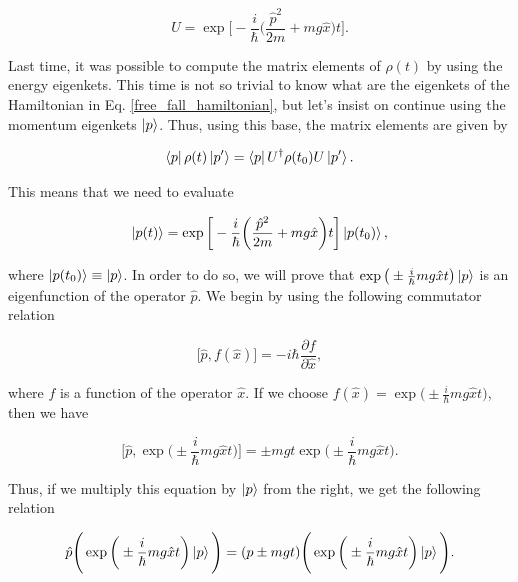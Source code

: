 \documentclass{article}
\begin{document}
\begin{equation}
    U = \exp \bigg[-\frac{i}{\hbar} \bigg( \frac{\hat{p}^{2}}{2m} + mg\hat{x} \bigg) t \bigg].
\end{equation}

Last time, it was possible to compute the matrix elements of $\rho (t)$ by using the energy eigenkets. This time is not so trivial to know what are the eigenkets of the Hamiltonian in Eq. \ref{free_fall_hamiltonian}, but let's insist on continue using the momentum eigenkets $\ket{p}$. Thus, using this base, the matrix elements are given by

\begin{equation}
    \bra{p} \rho (t) \ket{p'} = \bra{p} U^{\dagger} \rho (t_{0}) U \ket{p'}.
\end{equation}

This means that we need to evaluate

\begin{equation}
    \ket{p(t)} = \exp \bigg[-\frac{i}{\hbar} \bigg( \frac{\hat{p}^{2}}{2m} + mg\hat{x} \bigg) t \bigg] \ket{p(t_{0})}, 
\end{equation}

where $\ket{p(t_{0})} \equiv \ket{p}$. In order to do so, we will prove that $\exp \big(\pm \frac{i}{\hbar} mg \hat{x} t \big) \ket{p}$ is an eigenfunction of the operator $\hat{p}$. We begin by using the following commutator relation

\begin{equation}
    \big[ \hat{p}, f(\hat{x}) \big] = -i \hbar \frac{\partial f}{\partial \hat{x}},
\end{equation}

where $f$ is a function of the operator $\hat{x}$. If we choose $f(\hat{x})= \exp \big(\pm \frac{i}{\hbar} mg \hat{x} t \big) $, then we have

\begin{equation}
    \bigg[ \hat{p}, \exp \bigg(\pm \frac{i}{\hbar} mg \hat{x} t \bigg) \bigg] = \pm mgt \exp \bigg(\pm \frac{i}{\hbar} mg \hat{x} t \bigg).
\end{equation}

Thus, if we multiply this equation by $\ket{p}$ from the right, we get the following relation

\begin{equation}
    \hat{p} \Bigg( \exp \bigg(\pm \frac{i}{\hbar} mg \hat{x} t \bigg) \ket{p} \Bigg) = (p\pm mgt) \Bigg( \exp \bigg(\pm \frac{i}{\hbar} mg \hat{x} t \bigg) \ket{p} \Bigg).
\end{equation}
\end{document}
